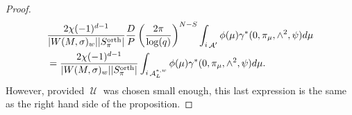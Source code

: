 \documentclass[12pt]{article}
\numberwithin{equation}{section}
\DeclareMathOperator{\orth}{orth}
\DeclareMathOperator{\cA}{\mathcal{A}}
\DeclareMathOperator{\cU}{\mathcal{U}}
\begin{document}
\begin{proof}
		\[\begin{aligned}
			\displaystyle & \frac{2\chi(-1)^{d-1}}{\lvert W(M,\sigma)_w\rvert \lvert S_\pi^{\orth}\rvert} \frac{D}{P}\left(\frac{2\pi}{\log(q)} \right)^{N-S} \int_{i\cA'} \phi(\mu) \gamma^*(0,\pi_\mu,\wedge^2,\psi) d\mu \\
			& =\frac{2\chi(-1)^{d-1}}{\lvert W(M,\sigma)_w\rvert \lvert S_\pi^{\orth}\rvert} \int_{i\cA_{L}^{*,w}} \phi(\mu) \gamma^*(0,\pi_\mu,\wedge^2,\psi) d\mu.
		\end{aligned}\]
		However, provided $\cU$ was chosen small enough, this last expression is the same as the right hand side of the proposition.
	\end{proof}
	
	
	
\end{document}
